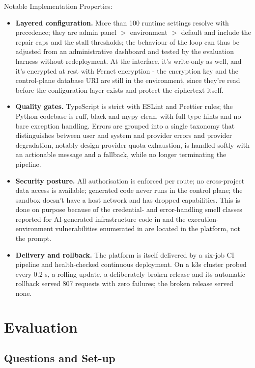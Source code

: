 \documentclass[pdflatex,sn-mathphys-num]{sn-jnl}%
\theoremstyle{thmstyleone}%
\theoremstyle{thmstyletwo}%
\theoremstyle{thmstylethree}%
\begin{document}
Notable Implementation Properties:

\begin{itemize}
\item \textbf{Layered configuration.} More than 100 runtime settings resolve with precedence; they are admin panel $>$ environment $>$ default and include the repair caps and the stall thresholds; the behaviour of the loop can thus be adjusted from an administrative dashboard and tested by the evaluation harness without redeployment. At the interface, it's write-only as well, and it's encrypted at rest with Fernet encryption - the encryption key and the control-plane database URI are still in the environment, since they're read before the configuration layer exists and protect the ciphertext itself.
\item \textbf{Quality gates.} TypeScript is strict with ESLint and Prettier rules; the Python codebase is ruff, black and mypy clean, with full type hints and no bare exception handling. Errors are grouped into a single taxonomy that distinguishes between user and system and provider errors and provider degradation, notably design-provider quota exhaustion, is handled softly with an actionable message and a fallback, while no longer terminating the pipeline.
\item \textbf{Security posture.} All authorisation is enforced per route; no cross-project data access is available; generated code never runs in the control plane; the sandbox doesn't have a host network and has dropped capabilities. This is done on purpose because of the credential- and error-handling smell classes reported for AI-generated infrastructure code in \cite{r04ghammam} and the execution-environment vulnerabilities enumerated in \cite{r24rabin} are located in the platform, not the prompt.
\item \textbf{Delivery and rollback.} The platform is itself delivered by a six-job CI pipeline and health-checked continuous deployment. On a k3s cluster probed every 0.2 s, a rolling update, a deliberately broken release and its automatic rollback served 807 requests with zero failures; the broken release served none.
\end{itemize}

\section{Evaluation}\label{sec8}

\subsection{Questions and Set-up}\label{sec8.1}
\end{document}
